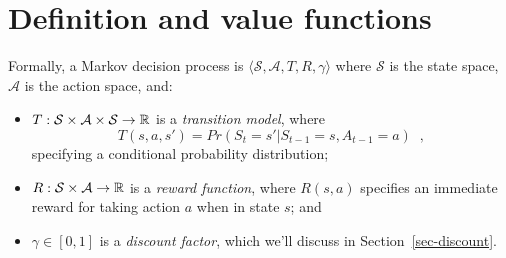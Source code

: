 \section{Definition and value functions}
\label{sec_mdps}

Formally, a Markov decision process is $\langle \mathcal S, \mathcal A, T, R,
  \gamma\rangle$ where $\mathcal{S}$ is the state space, $\mathcal{A}$ is the action space, and:
\begin{itemize}
  \item
        $T : \mathcal S \times \mathcal A \times \mathcal S \rightarrow \mathbb{R}$ is
        a {\em transition model}, where
        \[T(s, a, s') = Pr(S_t = s'|S_{t - 1} = s,
          A_{t - 1} = a)\;\;,\] specifying a conditional probability distribution;
  \item
        $R: \mathcal S \times \mathcal A \rightarrow \mathbb{R}$ is a {\em reward function},
        where $R(s, a)$ specifies an immediate reward for taking action $a$ when
        in state $s$; and
  \item $\gamma \in [0, 1]$ is a {\em discount factor}, which we'll
        discuss in Section~\ref{sec-discount}.
\end{itemize}

